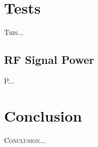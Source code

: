 \documentclass[12pt]{book}
\begin{document}
\chapter{Tests}

\lettrine{T}{his}...

\section{RF Signal Power}

P...


\chapter{Conclusion} \label{ch:conclusion}

\lettrine{C}{onclusion}...



\end{document}
